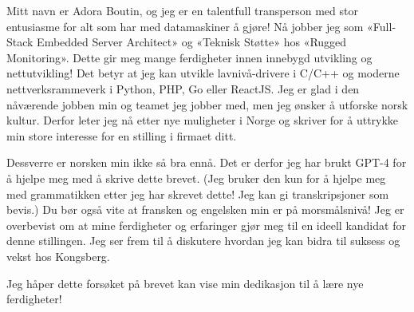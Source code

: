 \documentclass[a4paper,12pt]{article}
\begin{document}

\begin{coverletter}
    Mitt navn er Adora Boutin, og jeg er en talentfull transperson med stor entusiasme for alt som har med datamaskiner å gjøre! 
    Nå jobber jeg som «Full-Stack Embedded Server Architect» og «Teknisk Støtte» hos «Rugged Monitoring».
    Dette gir meg mange ferdigheter innen innebygd utvikling og nettutvikling! Det betyr at jeg kan utvikle lavnivå-drivere i C/C++ og moderne nettverksrammeverk i Python, PHP, Go eller ReactJS.
    Jeg er glad i den nåværende jobben min og teamet jeg jobber med, men jeg ønsker å utforske norsk kultur.
    Derfor leter jeg nå etter nye muligheter i Norge og skriver for å uttrykke min store interesse for en stilling i firmaet ditt.\newline

    Dessverre er norsken min ikke så bra ennå.
    Det er derfor jeg har brukt GPT-4 for å hjelpe meg med å skrive dette brevet.
    (Jeg bruker den kun for å hjelpe meg med grammatikken etter jeg har skrevet dette! Jeg kan gi transkripsjoner som bevis.) Du bør også vite at fransken og engelsken min er på morsmålsnivå! Jeg er overbevist om at mine ferdigheter og erfaringer gjør meg til en ideell kandidat for denne stillingen.
    Jeg ser frem til å diskutere hvordan jeg kan bidra til suksess og vekst hos Kongsberg.\newline

    Jeg håper dette forsøket på brevet kan vise min dedikasjon til å lære nye ferdigheter!
\end{coverletter}
\end{document}
